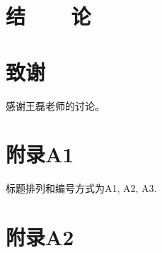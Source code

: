 \documentclass[A4,twoside,fontset=ubuntu,UTF8]{ctexart}
\begin{document}
\baselineskip

\section{结~~~~论}

\section*{致谢}

感谢王磊老师的讨论。


\section*{附录A1}

标题排列和编号方式为A1, A2, A3.

\section*{附录A2}
%
%
%
%
%
\end{document}
